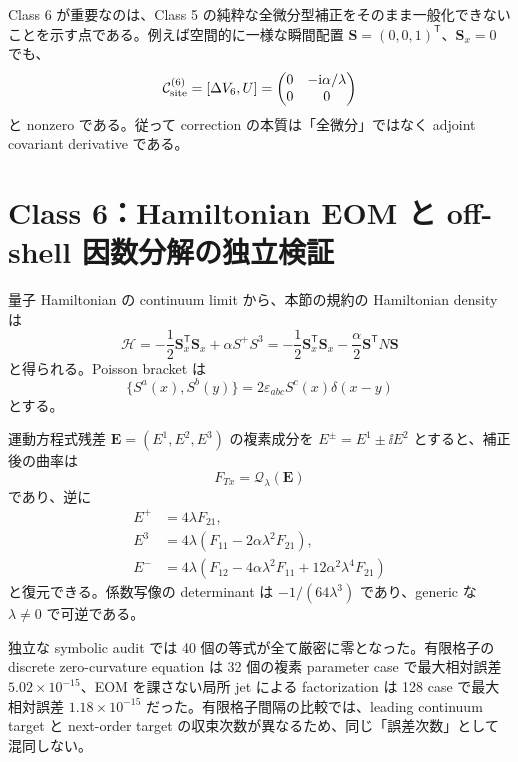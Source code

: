 Class 6 が重要なのは、Class 5 の純粋な全微分型補正をそのまま一般化できないことを示す点である。例えば空間的に一様な瞬間配置 $\boldsymbol S=(0,0,1)^{\mathsf T}$、$\boldsymbol S_x=0$ でも、
\begin{equation}
\mathcal C_{\rm site}^{(6)}=[\Delta V_6,U]
=\begin{pmatrix}0&-\mathrm i\alpha/\lambda\\0&0\end{pmatrix}
\label{eq:C6uniform}
\end{equation}
と nonzero である。従って correction の本質は「全微分」ではなく adjoint covariant derivative である。

\section{Class 6：Hamiltonian EOM と off-shell 因数分解の独立検証}
量子 Hamiltonian の continuum limit から、本節の規約の Hamiltonian density は
\begin{equation}
\mathcal H=-\frac12\boldsymbol S_x^{\mathsf T}\boldsymbol S_x+\alpha S^+S^3
=-\frac12\boldsymbol S_x^{\mathsf T}\boldsymbol S_x-\frac\alpha2\boldsymbol S^{\mathsf T}N\boldsymbol S
\label{eq:C6Hind}
\end{equation}
と得られる。Poisson bracket は
\begin{equation}
\{S^a(x),S^b(y)\}=2\varepsilon_{abc}S^c(x)\delta(x-y)
\end{equation}
とする。

運動方程式残差 $\boldsymbol E=(E^1,E^2,E^3)$ の複素成分を $E^\pm=E^1\pm\ii E^2$ とすると、補正後の曲率は
\begin{equation}
F_{Tx}=\mathcal Q_\lambda(\boldsymbol E)
\label{eq:C6Off}
\end{equation}
であり、逆に
\begin{align}
E^+&=4\lambda F_{21},\\
E^3&=4\lambda(F_{11}-2\alpha\lambda^2F_{21}),\\
E^-&=4\lambda(F_{12}-4\alpha\lambda^2F_{11}+12\alpha^2\lambda^4F_{21})
\label{eq:C6inv}
\end{align}
と復元できる。係数写像の determinant は $-1/(64\lambda^3)$ であり、generic な $\lambda\neq0$ で可逆である。

独立な symbolic audit では 40 個の等式が全て厳密に零となった。有限格子の discrete zero-curvature equation は 32 個の複素 parameter case で最大相対誤差 $5.02\times10^{-15}$、EOM を課さない局所 jet による factorization は 128 case で最大相対誤差 $1.18\times10^{-15}$ だった。有限格子間隔の比較では、leading continuum target と next-order target の収束次数が異なるため、同じ「誤差次数」として混同しない。

